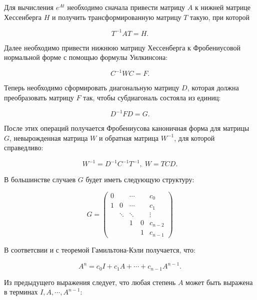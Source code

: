 \documentclass[master, och, diploma, times]{sty/SCWorks}
\theoremstyle{plain}
\theoremstyle{definition}
\numberwithin{equation}{section}
\begin{document}
Для вычисления $e^{At}$ необходимо сначала привести матрицу $A$ к нижней матрице Хессенберга $H$ и получить трансформированную матрицу $T$ такую, при которой

\begin{equation}
T^{-1}AT=H.
\end{equation} 

\noindent Далее необходимо привести нижнюю матрицу Хессенберга к Фробениусовой нормальной форме с помощью формулы Уилкинсона:

\begin{equation}
C^{-1}WC=F.
\end{equation}

\noindent Теперь необходимо сформировать диагональную матрицу $D$, которая должна преобразовать матрицу $F$ так, чтобы субдиагональ состояла из единиц:

\begin{equation}
D^{-1}FD=G.
\end{equation}

\noindent После этих операций получается Фробениусова каноничная форма \cite{bib:algebra:1} для матрицы $G$, невырожденная матрица $W$ и обратная матрица $W^{-1}$, для которой справедливо:

\begin{equation}
W^{-1}=D^{-1}C^{-1}T^{-1}, \; W=TCD.
\end{equation}
 
\noindent В большинстве случаев $G$ будет иметь следующую структуру:

\begin{equation}G=
\begin{pmatrix}
0 & & \cdots & & c_0\\
1 & 0 & \cdots & & c_1\\
& \ddots & \ddots & & \vdots \\
& & 1 & 0 & c_{n-2} \\
& & & 1 & c_{n-1}
\end{pmatrix}
\end{equation}
 
\noindent В соответсвии и с теоремой Гамильтона-Кэли \cite{bib:algebra:roitenberg} получается, что:

\begin{equation}
A^n=c_0I+c_1A+\cdots+c_{n-1}A^{n-1}.
\end{equation}

Из предыдущего выражения следует, что любая степень $A$ может быть выражена в терминах $I, A, \cdots, A^{n-1}$:
\end{document}
